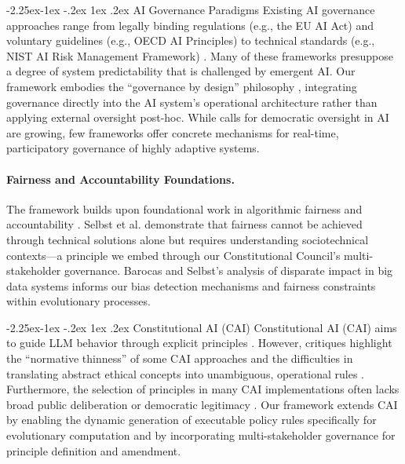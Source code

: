 \documentclass[manuscript,screen,review,anonymous,9pt]{acmart}
\makeatletter
\renewcommand\subsection{\@startsection{subsection}{2}{\z@}%
  {-2.25ex\@plus -1ex \@minus -.2ex}%
  {1ex \@plus .2ex}%
  {\normalfont\large\bfseries}}
\makeatother
\begin{document}
\subsection{AI Governance Paradigms}
Existing AI governance approaches range from legally binding regulations (e.g., the EU AI Act) and voluntary guidelines (e.g., OECD AI Principles) to technical standards (e.g., NIST AI Risk Management Framework) \cite{Wynants2025ETHICAL, WorldBank2024AIGovernance, CambridgeUP2024CorporateGovernance}. Many of these frameworks presuppose a degree of system predictability that is challenged by emergent AI. Our framework embodies the ``governance by design'' philosophy \cite{Engin2025AdaptiveAIGovernance}, integrating governance directly into the AI system's operational architecture rather than applying external oversight post-hoc. While calls for democratic oversight in AI are growing, few frameworks offer concrete mechanisms for real-time, participatory governance of highly adaptive systems.

\paragraph{Fairness and Accountability Foundations.} The framework builds upon foundational work in algorithmic fairness and accountability \cite{Selbst2019FairnessAccountability, Barocas2016BigDataDisparate}. Selbst et al. demonstrate that fairness cannot be achieved through technical solutions alone but requires understanding sociotechnical contexts---a principle we embed through our Constitutional Council's multi-stakeholder governance. Barocas and Selbst's analysis of disparate impact in big data systems informs our bias detection mechanisms and fairness constraints within evolutionary processes.

\subsection{Constitutional AI (CAI)}
Constitutional AI (CAI) aims to guide LLM behavior through explicit principles \cite{Bai2025ConstitutionalAI}. However, critiques highlight the ``normative thinness'' of some CAI approaches and the difficulties in translating abstract ethical concepts into unambiguous, operational rules \cite{DigiCon2025ConstitutionalAIThin, ChaconMenke2025CAISmallLLMs}. Furthermore, the selection of principles in many CAI implementations often lacks broad public deliberation or democratic legitimacy \cite{Hwang2025PublicCAI}. Our framework extends CAI by enabling the dynamic generation of executable policy rules specifically for evolutionary computation and by incorporating multi-stakeholder governance for principle definition and amendment.
\end{document}
